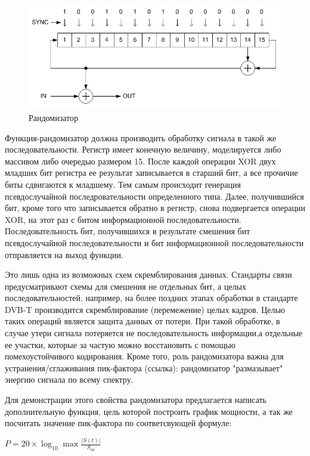 \begin{figure}[h!]
\centering
\includegraphics[width=1\textwidth]{rand}
\caption{Рандомизатор} \label{fg:rand}
\end{figure}

Функция-рандомизатор должна производить обработку сигнала в такой же последовательности. 
Регистр имеет конечную величину, моделируется либо массивом либо очередью размером 15.
После каждой операции XOR двух младших бит регистра ее результат записывается в старший бит, а все прочичие биты сдвигаются к младшему. 
Тем самым происходит генерация псевдослучайной последровательности определенного типа. 
Далее, получившийся бит, кроме того что записывается обратно в регистр, снова подвергается операции XOR, на этот раз с битом информационной последовательности. 
Последовательность бит, получившихся в результате смешения бит псевдослучайной последовательности и бит информационной последовательности отправляется на выход функции. 

Это лишь одна из возможных схем скремблирования данных. Стандарты связи предусматривают схемы для смешения не отдельных бит, а целых последовательностей, например, на более поздних этапах обработки в стандарте DVB-T производится скремблирование (перемежение) целых кадров.   
Целью таких операций является защита данных от потери. 
При такой обработке, в случае утери сигнала потеряется не последовательность информации,а отдельные ее участки, которые за частую можно восстановить с помощью помехоустойчивого кодирования. 
Кроме того, роль рандомизатора важна  для устранения/сглаживания пик-фактора (ссылка): рандомизатор "размазывает" энергию сигнала по всему спектру.

Для демонстрации этого свойства рандомизатора предлагается написать дополнительную функция, цель которой построить график мощности, а так же посчитать значение пик-фактора по соответсвующей формуле:

$ P = 20\times \log_{10}{\max{\frac{|S(t)|}{S_{ср}}}}$

